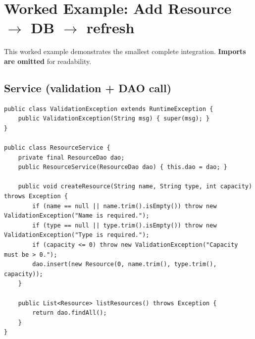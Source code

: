 \documentclass[11pt]{article}
\begin{document}
\notesources{\OOPSUnitVISources}

\section{Worked Example: Add Resource $\rightarrow$ DB $\rightarrow$ refresh}
This worked example demonstrates the smallest complete integration.
\textbf{Imports are omitted} for readability.

\subsection{Service (validation + DAO call)}
\begin{lstlisting}
public class ValidationException extends RuntimeException {
    public ValidationException(String msg) { super(msg); }
}

public class ResourceService {
    private final ResourceDao dao;
    public ResourceService(ResourceDao dao) { this.dao = dao; }

    public void createResource(String name, String type, int capacity) throws Exception {
        if (name == null || name.trim().isEmpty()) throw new ValidationException("Name is required.");
        if (type == null || type.trim().isEmpty()) throw new ValidationException("Type is required.");
        if (capacity <= 0) throw new ValidationException("Capacity must be > 0.");
        dao.insert(new Resource(0, name.trim(), type.trim(), capacity));
    }

    public List<Resource> listResources() throws Exception {
        return dao.findAll();
    }
}
\end{lstlisting}
\end{document}
